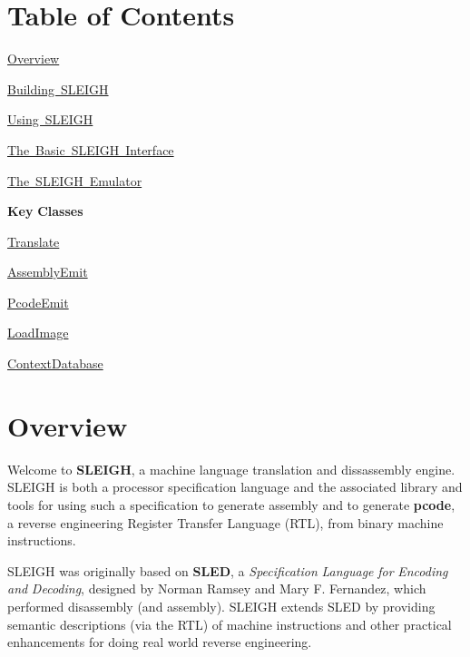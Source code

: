 \hypertarget{sleigh_sleightoc}{}\section{Table of Contents}\label{sleigh_sleightoc}

\begin{DoxyItemize}
\item \mbox{\hyperlink{sleigh_sleighoverview}{Overview}}
\item \mbox{\hyperlink{sleigh_sleighbuild}{Building S\+L\+E\+I\+GH}}
\item \mbox{\hyperlink{sleigh_sleighuse}{Using S\+L\+E\+I\+GH}}
\item \mbox{\hyperlink{sleighAPIbasic}{The Basic S\+L\+E\+I\+GH Interface}}
\item \mbox{\hyperlink{sleighAPIemulate}{The S\+L\+E\+I\+GH Emulator}}
\end{DoxyItemize}

{\bfseries{Key}} {\bfseries{Classes}} 
\begin{DoxyItemize}
\item \mbox{\hyperlink{class_translate}{Translate}}
\item \mbox{\hyperlink{class_assembly_emit}{Assembly\+Emit}}
\item \mbox{\hyperlink{class_pcode_emit}{Pcode\+Emit}}
\item \mbox{\hyperlink{class_load_image}{Load\+Image}}
\item \mbox{\hyperlink{class_context_database}{Context\+Database}}
\end{DoxyItemize}\hypertarget{sleigh_sleighoverview}{}\section{Overview}\label{sleigh_sleighoverview}
Welcome to {\bfseries{S\+L\+E\+I\+GH}}, a machine language translation and dissassembly engine. S\+L\+E\+I\+GH is both a processor specification language and the associated library and tools for using such a specification to generate assembly and to generate {\bfseries{pcode}}, a reverse engineering Register Transfer Language (R\+TL), from binary machine instructions.

S\+L\+E\+I\+GH was originally based on {\bfseries{S\+L\+ED}}, a {\itshape Specification} {\itshape Language} {\itshape for} {\itshape Encoding} {\itshape and} {\itshape Decoding}, designed by Norman Ramsey and Mary F. Fernandez, which performed disassembly (and assembly). S\+L\+E\+I\+GH extends S\+L\+ED by providing semantic descriptions (via the R\+TL) of machine instructions and other practical enhancements for doing real world reverse engineering.

